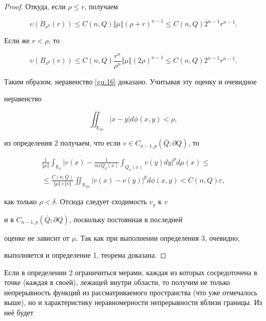 \begin{proof}
Откуда, если $\rho \leq r$, получаем

$$

\upsilon (B_{x^0}(r)) \leq C(n,Q) \Vert\mu\Vert (\rho + r)^{n-1} \leq C(n,

Q) 2^{n-1} r^{n-1}.

$$

Если же $r < \rho$, то

$$

\upsilon (B_{x^0}(r)) \leq C(n,Q) \frac{r^n}{\rho^n} \Vert\mu\Vert (2 \rho )^{n-1} \leq C(n, Q) 2^{n-1} r^{n-1}.

$$



Таким образом, неравенство \eqref{gu:16} доказано. Учитывая эту оценку и очевидное

неравенство

$$

\iint_{{\mathbb R}_{2n}} |x - y| d\phi (x, y) < \rho,

$$

из определения 2 получаем, что если $v \in C_{n-1,p}(\bar {Q} ; \partial Q)$, то

\begin{multline*}

\frac{1}{\Vert\mu\Vert} \int_{{\mathbb R}_n} \biggl| v(x) - \frac{1}{m(Q_{\rho}(x)}

\int_{Q_{\rho}(x)} v(y) dy \biggr|^p d\mu (x) \leq

\\

\leq \frac{C(n, Q)}{\Vert\mu\Vert + \Vert\upsilon\Vert} \iint_{{\mathbb R}_{2n}} |v(x) - v(y)|^p d\phi (x, y) < C(n, Q) \varepsilon,

\end{multline*}

как только $\rho < \delta$. Отсюда следует сходимость $v_{\varrho}$ к $v$

и в $C_{n-1,p}(\bar {Q} ; \partial Q)$, поскольку постоянная в последней

оценке не зависит от $\mu$. Так как при выполнении определения 3, очевидно,

выполняется и определение 1, теорема доказана. \end{proof}



\smallskip



Если в определении 2 ограничиться мерами, каждая из которых сосредоточена в точке (каждая в своей), лежащей внутри области, то получим не только непрерывность функций из рассматриваемого пространства (что уже отмечалось выше), но и характеристику неравномерности непрерывности вблизи границы. Из неё будет

